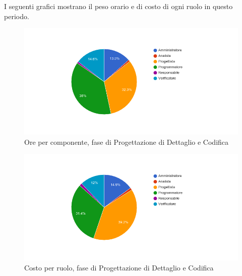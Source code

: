 I seguenti grafici mostrano il peso orario e di costo di ogni ruolo in questo periodo.

\begin{figure}[H]
  \begin{center}
    \includegraphics[width=15cm]{res/img/prospettoEconomico/orePerRuoloProgettazioneDettaglioCodifica.png}
  \caption{Ore per componente, fase di Progettazione di Dettaglio e Codifica}
  \end{center} 
\end{figure}  

\begin{figure}[H]
  \begin{center}
    \includegraphics[width=15cm]{res/img/prospettoEconomico/costoPerRuoloProgettazioneDettaglioCodifica.png}
  \caption{Costo per ruolo, fase di Progettazione di Dettaglio e Codifica}
  \end{center} 
\end{figure}  


